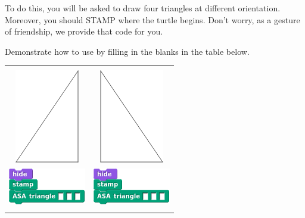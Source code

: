 \documentclass[noauthor,nooutcomes,12pt,hints,handout]{ximera}
\begin{document}
To do this, you will be asked to draw four triangles at different
orientation. Moreover, you should STAMP where the turtle begins. Don't
worry, as a gesture of friendship, we provide that code for you.


\mynewpage

\begin{question}%
  Demonstrate how to use  by filling in the
  blanks in the table below.
  \begin{center}
    \begin{tabular}{|c||c|}\hline
      &  \\
      \includegraphics{EgStageII.png} & \includegraphics{EgStageI.png} \\
      \includegraphics{ASAstampBlank.png} & \includegraphics{ASAstampBlank.png} \\
      \hline\hline
      &  \\

\end{tabular}
\end{center}
\end{question}
\end{document}
